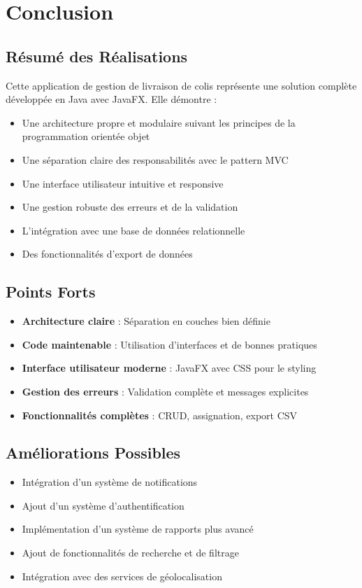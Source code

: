 \documentclass{rapportENSIAS}
\begin{document}
\section{Conclusion}

\subsection{R\'{e}sum\'{e} des R\'{e}alisations}

Cette application de gestion de livraison de colis repr\'{e}sente une solution compl\`{e}te d\'{e}velopp\'{e}e en Java avec JavaFX. Elle d\'{e}montre :

\begin{itemize}
    \item Une architecture propre et modulaire suivant les principes de la programmation orient\'{e}e objet
    \item Une s\'{e}paration claire des responsabilit\'{e}s avec le pattern MVC
    \item Une interface utilisateur intuitive et responsive
    \item Une gestion robuste des erreurs et de la validation
    \item L'int\'{e}gration avec une base de donn\'{e}es relationnelle
    \item Des fonctionnalit\'{e}s d'export de donn\'{e}es
\end{itemize}

\subsection{Points Forts}

\begin{itemize}
    \item \textbf{Architecture claire} : S\'{e}paration en couches bien d\'{e}finie
    \item \textbf{Code maintenable} : Utilisation d'interfaces et de bonnes pratiques
    \item \textbf{Interface utilisateur moderne} : JavaFX avec CSS pour le styling
    \item \textbf{Gestion des erreurs} : Validation compl\`{e}te et messages explicites
    \item \textbf{Fonctionnalit\'{e}s compl\`{e}tes} : CRUD, assignation, export CSV
\end{itemize}

\subsection{Am\'{e}liorations Possibles}

\begin{itemize}
    \item Int\'{e}gration d'un syst\`{e}me de notifications
    \item Ajout d'un syst\`{e}me d'authentification
    \item Impl\'{e}mentation d'un syst\`{e}me de rapports plus avanc\'{e}
    \item Ajout de fonctionnalit\'{e}s de recherche et de filtrage
    \item Int\'{e}gration avec des services de g\'{e}olocalisation
\end{itemize}
\end{document}
